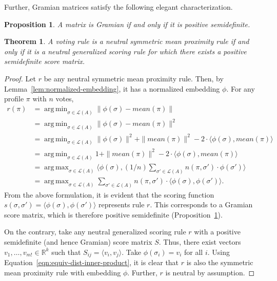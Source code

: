 \documentclass[10pt,letterpaper]{article}
\newcommand{\calL}{{\mathcal{L}}}
\newcommand{\rank}{{\calL(A)}}
\DeclareMathOperator*{\argmax}{arg\,max}
\DeclareMathOperator*{\argmin}{arg\,min}
\newtheorem{theorem}{Theorem}
\newtheorem{proposition}{Proposition}
\begin{document}
Further, Gramian matrices satisfy the following elegant characterization.
\begin{proposition}
A matrix is Gramian if and only if it is positive semidefinite.
\label{prop:gramian}
\end{proposition}

\begin{theorem}
A voting rule is a neutral symmetric mean proximity rule if and only if it is a neutral generalized scoring rule for which there exists a positive semidefinite score matrix. 
\label{thm:psd}
\end{theorem}
\begin{proof}
Let $r$ be any neutral symmetric mean proximity rule. Then, by Lemma~\ref{lem:normalized-embedding}, it has a normalized embedding $\phi$. For any profile $\pi$ with $n$ votes,
\begin{align}
r(\pi) &= \argmin_{\sigma \in \rank} \|\phi(\sigma)-mean(\pi)\| \nonumber\\
&= \argmin_{\sigma \in \rank} \|\phi(\sigma)-mean(\pi)\|^2 \nonumber\\
&= \argmin_{\sigma \in \rank} \|\phi(\sigma)\|^2 + \|mean(\pi)\|^2 - 2 \cdot \langle \phi(\sigma),mean(\pi) \rangle  \nonumber\\
&= \argmin_{\sigma \in \rank} 1+\|mean(\pi)\|^2 - 2 \cdot \langle \phi(\sigma), mean(\pi) \rangle \nonumber\\
&= \argmax_{\sigma \in \rank} \langle \phi(\sigma), (1/n) \sum_{\sigma' \in \rank} n(\pi,\sigma') \cdot \phi(\sigma') \rangle \nonumber\\
&= \argmax_{\sigma \in \rank} \sum_{\sigma' \in \rank} n(\pi,\sigma') \cdot \langle \phi(\sigma),\phi(\sigma') \rangle. \label{eqn:equiv-dist-inner-product}
\end{align}
From the above formulation, it is evident that the scoring function $s(\sigma,\sigma') = \langle \phi(\sigma),\phi(\sigma') \rangle$ represents rule $r$. This corresponds to a Gramian score matrix, which is therefore positive semidefinite (Proposition~\ref{prop:gramian}).

On the contrary, take any neutral generalized scoring rule $r$ with a positive semidefinite (and hence Gramian) score matrix $S$. Thus, there exist vectors $v_1,\ldots,v_{m!} \in \mathbb{R}^k$ such that $S_{ij} = \langle v_i,v_j \rangle$. Take $\phi(\sigma_i) = v_i$ for all $i$. Using Equation~\eqref{eqn:equiv-dist-inner-product}, it is clear that $r$ is also the symmetric mean proximity rule with embedding $\phi$. Further, $r$ is neutral by assumption. 
\end{proof}
\end{document}
